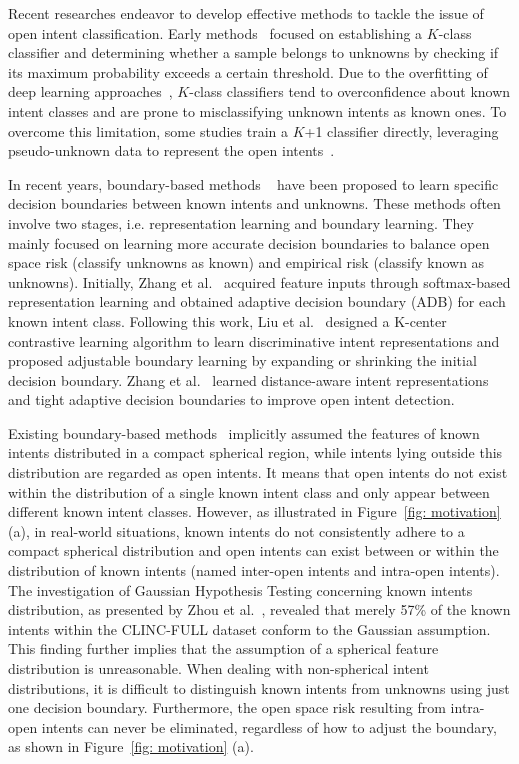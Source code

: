 \documentclass[letterpaper]{article} %
\theoremstyle{definition}
\begin{document}
Recent researches endeavor to develop effective methods to tackle the issue of open intent classification. 
Early methods~\cite{jain2014multi,hendrycks2022baseline} focused on establishing a $K$-class classifier and determining whether a sample belongs to unknowns by checking if its maximum probability exceeds a certain threshold. 
Due to the overfitting of deep learning approaches~\cite{guo2017calibration}, $K$-class classifiers tend to overconfidence about known intent classes and are prone to misclassifying unknown intents as known ones. To overcome this limitation, some studies train a $K$+1 classifier directly, leveraging pseudo-unknown data to represent the open intents~\cite{zheng2020out,cheng2022learning}. 

In recent years, boundary-based methods ~\cite{zhang2021deep,zhang2023learning,yang2022three} have been proposed to learn specific decision boundaries between known intents and unknowns.
These methods often involve two stages, i.e. representation learning and boundary learning. 
They mainly focused on learning more accurate decision boundaries to balance open space risk (classify unknowns as known) and empirical risk (classify known as unknowns). 
Initially, Zhang et al.~\cite{zhang2021deep} acquired feature inputs through softmax-based representation learning and obtained adaptive decision boundary (ADB) for each known intent class. Following this work, Liu et al.~\cite{liu2023effective} designed a K-center contrastive learning algorithm to learn discriminative intent representations and proposed adjustable boundary learning by expanding or shrinking the initial decision boundary. Zhang et al.~\cite{zhang2023learning} learned distance-aware intent representations and tight adaptive decision boundaries to improve open intent detection.

Existing boundary-based methods~\cite{zhang2021deep,zhang2023learning} implicitly assumed the features of known intents distributed in a compact spherical region, while intents lying outside this distribution are regarded as open intents.
It means that open intents do not exist within the distribution of a single known intent class and only appear between different known intent classes. 
However, as illustrated in Figure~\ref{fig: motivation} (a), in real-world situations, known intents do not consistently adhere to a compact spherical distribution and open intents can exist between or within the distribution of known intents (named inter-open intents and intra-open intents). 
The investigation of Gaussian Hypothesis Testing concerning known intents distribution, as presented by Zhou et al.~\cite{zhou2022knn}, revealed that merely 57\% of the known intents within the CLINC-FULL dataset conform to the Gaussian assumption. This finding further implies that the assumption of a spherical feature distribution is unreasonable.
When dealing with non-spherical intent distributions, it is difficult to distinguish known intents from unknowns using just one decision boundary. 
Furthermore, the open space risk resulting from intra-open intents can never be eliminated, regardless of how to adjust the boundary, as shown in Figure~\ref{fig: motivation} (a).
\end{document}

